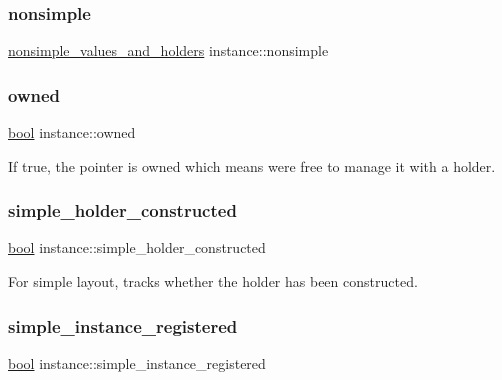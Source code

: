 \mbox{\label{structinstance_a0a744abc33ad85e3df4d4aa69093f38f}} 
\subsubsection{\texorpdfstring{nonsimple}{nonsimple}}
{\footnotesize\ttfamily \mbox{\hyperlink{structnonsimple__values__and__holders}{nonsimple\+\_\+values\+\_\+and\+\_\+holders}} instance\+::nonsimple}

\mbox{\label{structinstance_a69b3e638c182ecbbaaa5625ce3c36e99}} 
\subsubsection{\texorpdfstring{owned}{owned}}
{\footnotesize\ttfamily \mbox{\hyperlink{asdl_8h_af6a258d8f3ee5206d682d799316314b1}{bool}} instance\+::owned}



If true, the pointer is owned which means we\textquotesingle{}re free to manage it with a holder. 

\mbox{\label{structinstance_a70b19567d7738df6679e1599e7d3ff75}} 
\subsubsection{\texorpdfstring{simple\_holder\_constructed}{simple\_holder\_constructed}}
{\footnotesize\ttfamily \mbox{\hyperlink{asdl_8h_af6a258d8f3ee5206d682d799316314b1}{bool}} instance\+::simple\+\_\+holder\+\_\+constructed}



For simple layout, tracks whether the holder has been constructed. 

\mbox{\label{structinstance_a464df414f8c21853c43be0ab4ccf8e93}} 
\subsubsection{\texorpdfstring{simple\_instance\_registered}{simple\_instance\_registered}}
{\footnotesize\ttfamily \mbox{\hyperlink{asdl_8h_af6a258d8f3ee5206d682d799316314b1}{bool}} instance\+::simple\+\_\+instance\+\_\+registered}




